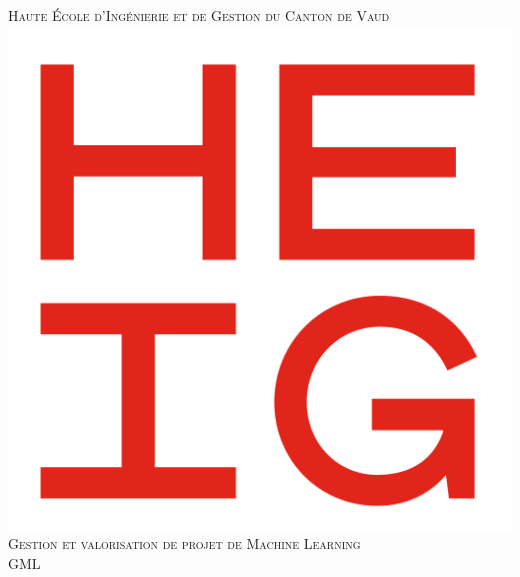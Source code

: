 \documentclass[12pt]{article}
\begin{document}
\begin{titlepage}

\newcommand{\HRule}{\rule{\linewidth}{0.5mm}} %

\center %
 

\textsc{\LARGE Haute École d'Ingénierie et de Gestion du Canton de Vaud}\\[1.5cm] %
\includegraphics[scale=.2]{images/heig.png}\\[1cm] %
\textsc{\Large Gestion et valorisation de projet de Machine Learning}\\[0.5cm] %
\textsc{\large GML}\\[0.5cm] %




\end{titlepage}
\end{document}
